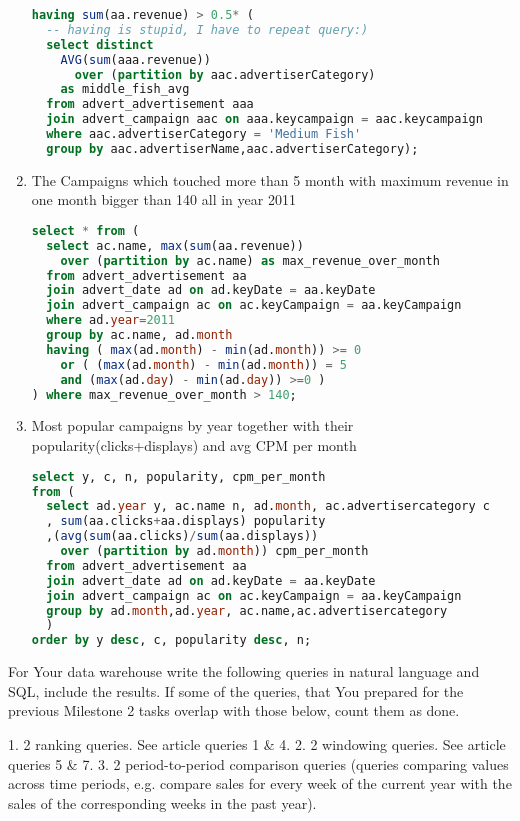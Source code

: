 \begin{enumerate}
\begin{lstlisting}[language=sql]
having sum(aa.revenue) > 0.5* (
  -- having is stupid, I have to repeat query:)
  select distinct
    AVG(sum(aaa.revenue)) 
      over (partition by aac.advertiserCategory) 
    as middle_fish_avg
  from advert_advertisement aaa 
  join advert_campaign aac on aaa.keycampaign = aac.keycampaign
  where aac.advertiserCategory = 'Medium Fish'   
  group by aac.advertiserName,aac.advertiserCategory);
  \end{lstlisting}
\item    The Campaigns which touched more than 5 month with maximum revenue in one month bigger than 140 all in year 2011 
  \begin{lstlisting}[language=sql] 
select * from (
  select ac.name, max(sum(aa.revenue)) 
    over (partition by ac.name) as max_revenue_over_month
  from advert_advertisement aa
  join advert_date ad on ad.keyDate = aa.keyDate
  join advert_campaign ac on ac.keyCampaign = aa.keyCampaign
  where ad.year=2011
  group by ac.name, ad.month
  having ( max(ad.month) - min(ad.month)) >= 0 
    or ( (max(ad.month) - min(ad.month)) = 5 
    and (max(ad.day) - min(ad.day)) >=0 )
) where max_revenue_over_month > 140;
  \end{lstlisting}
\item Most popular campaigns by year together with their popularity(clicks+displays) and  avg CPM per month
  \begin{lstlisting}[language=sql] 
select y, c, n, popularity, cpm_per_month
from (
  select ad.year y, ac.name n, ad.month, ac.advertisercategory c
  , sum(aa.clicks+aa.displays) popularity
  ,(avg(sum(aa.clicks)/sum(aa.displays)) 
    over (partition by ad.month)) cpm_per_month 
  from advert_advertisement aa
  join advert_date ad on ad.keyDate = aa.keyDate
  join advert_campaign ac on ac.keyCampaign = aa.keyCampaign
  group by ad.month,ad.year, ac.name,ac.advertisercategory
  )
order by y desc, c, popularity desc, n;

  \end{lstlisting}
\end{enumerate}


For Your data warehouse write the following queries in natural language and
SQL, include the results. If some of the queries, that You prepared for the
previous Milestone 2 tasks overlap with those below, count them as done.

1. 2 ranking queries. See article queries 1 & 4.
2. 2 windowing queries. See article queries 5 & 7.
3. 2 period-to-period comparison queries (queries comparing values across
time periods, e.g. compare sales for every week of the current year with
the sales of the corresponding weeks in the past year).

